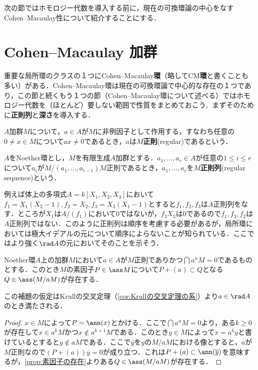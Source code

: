 次の節ではホモロジー代数を導入する前に，現在の可換環論の中心をなすCohen--Macaulay性について紹介することにする．

\section{Cohen--Macaulay 加群}

重要な局所環のクラスの１つにCohen--Macaulay\textbf{環}（略してCM\textbf{環}と書くことも多い）がある．Cohen--Macaulay環は現在の可換環論で中心的な存在の１つであり，この節と続くもう１つの節（Cohen--Macaulay環について述べる）ではホモロジー代数を（ほとんど）要しない範囲で性質をまとめておこう．まずそのために\textbf{正則列}と\textbf{深さ}を導入する．

\begin{defi}[正則元]
	$A$加群$M$について，$a\in A$が$M$に非例因子として作用する，すなわち任意の$0\neq x\in M$について$ax\neq0$であるとき，$a$は$M$\textbf{正則}(regular)であるという．
\end{defi}

\begin{defi}[正則列]
	$A$をNoether環とし，$M$を有限生成$A$加群とする．$a_1,\dots,a_r\in A$が任意の$1\leq i\leq r$について$a_i$が$M/(a_1,\dots,a_{i-1})M$正則であるとき，$a_1,\dots,a_r$を$M$\textbf{正則列}(regular sequence)という．
\end{defi}

例えば体上の多項式$A=k[X_1,X_2,X_3]$において$f_1=X_1(X_2-1),f_2=X_2,f_3=X_3(X_1-1)$とすると$f_1,f_2,f_3$は$A$正則列をなす．ところが$X_1$は$A/(f_1)$において$0$ではないが，$f_3X_3$は$0$であるので$f_1,f_3,f_2$は$A$正則列ではない．このように正則列は順序を考慮する必要があるが，局所環においては極大イデアルの元について順序によらないことが知られている．ここではより強く$\rad A$の元においてそのことを示そう．

\begin{lem}\label{lem:正則元と素因子}
	Noether環$A$上の加群$M$において$a\in A$が$M$正則でありかつ$\bigcap a^nM=0$であるものとする．このとき$M$の素因子$P\in\ass M$について$P+(a)\subset Q$となる$Q\in\ass (M/aM)$が存在する．
\end{lem}

この補題の仮定はKrullの交叉定理（\ref{cor:Krullの交叉定理の系}）より$a\in\rad A$のとき満たされる．

\begin{proof}
	$x\in M$によって$P=\ann (x)$とかける．ここで$\bigcap a^nM=0$より，ある$k\geq0$が存在して$x\in a^kM$かつ$x\not\in a^{k+1}M$である．このとき$y\in M$によって$x=a^ky$と書けているとすると$y\not\in aM$である．ここで$\bar{y}$を$y$の$M/aM$における像とすると，$a$が$M$正則なので$(P+(a))\bar{y}=0$が成り立つ．これは$P+(a)\subset\ann (\bar{y})$を意味するが，\ref{prop:素因子の存在}よりある$Q\in\ass (M/aM)$が存在する．
\end{proof}

